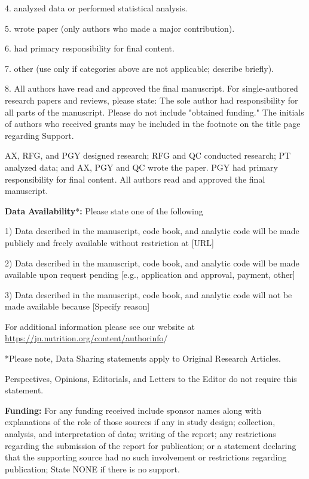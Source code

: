\documentclass[conference]{IEEEtran}
\begin{document}
4.    analyzed data or performed statistical analysis. 

5.    wrote paper (only authors who made a major contribution). 

6.    had primary responsibility for final content. 

7.    other (use only if categories above are not applicable; describe briefly).

8.    All authors have read and approved the final manuscript. For single-authored research papers and reviews, please state: The sole author had responsibility for all parts of the manuscript. Please do not include "obtained funding." The initials of authors who received grants may be included in the footnote on the title page regarding Support.

AX, RFG, and PGY designed research; RFG and QC conducted research; PT analyzed data; and AX, PGY and QC wrote the paper. PGY had primary responsibility for final content. All authors read and approved the final manuscript.

\textbf{Data }\textbf{Availability}*\textbf{: }Please state one of the following 

1)  Data described in the manuscript, code book, and analytic code will be made publicly and freely available without restriction at  [URL]

2)  Data described in the manuscript, code book, and analytic code will be made available upon request pending  [e.g., application and approval, payment, other]

3)  Data described in the manuscript, code book, and analytic code will not be made available because [Specify reason]

For additional information please see our website at \url{https://jn.nutrition.org/content/authorinfo}/

*Please note, Data Sharing statements apply to Original Research Articles. 

 Perspectives, Opinions, Editorials, and Letters to the Editor do not require this statement.

\textbf{Funding}\textbf{:}\textbf{ }For any funding received include sponsor names along with explanations of the role of those sources if any in study design; collection, analysis, and interpretation of data; writing of the report; any restrictions regarding the submission of the report for publication; or a statement declaring that the supporting source had no such involvement or restrictions regarding publication; State NONE if there is no support.
\end{document}
